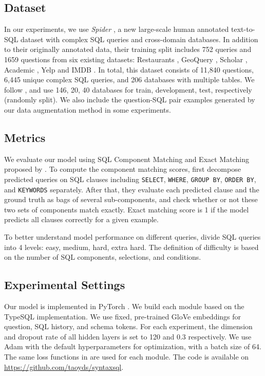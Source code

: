 \documentclass[11pt,a4paper]{article}
\begin{document}
\subsection{Dataset}
In our experiments, we use \textit{Spider} \cite{Yu&al.18.emnlp.corpus}, a new large-scale human annotated text-to-SQL dataset with complex SQL queries and cross-domain databases. In addition to their originally annotated data, their training split includes 752 queries and 1659 questions from six existing datasets: Restaurants \cite{tang2001using,Popescu03}, GeoQuery \cite{zelle96}, Scholar \cite{iyer17}, Academic \cite{li2014constructing}, Yelp and IMDB \cite{Yaghmazadeh17}.
In total, this dataset consists of 11,840 questions, 6,445 unique complex SQL queries, and 206 databases with multiple tables.
We follow \cite{Yu&al.18.emnlp.corpus}, and use 146, 20, 40 databases for train, development, test, respectively (randomly split).
We also include the question-SQL pair examples generated by our data augmentation method in some experiments.


\subsection{Metrics}
We evaluate our model using SQL Component Matching and Exact Matching proposed by \cite{Yu&al.18.emnlp.corpus}.
To compute the component matching scores, \citet{Yu&al.18.emnlp.corpus} first decompose predicted queries on SQL clauses including \texttt{SELECT}, \texttt{WHERE}, \texttt{GROUP BY}, \texttt{ORDER BY}, and \texttt{KEYWORDS} separately.
After that, they evaluate each predicted clause and the ground truth as bags of several sub-components, and check whether or not these two sets of components match exactly.
Exact matching score is 1 if the model predicts all clauses correctly for a given example.

To better understand model performance on different queries, 
\cite{Yu&al.18.emnlp.corpus} divide SQL queries into 4 levels: easy, medium, hard, extra hard. The definition of difficulty is based on the number of SQL components, selections, and conditions. 



\subsection{Experimental Settings}

Our model is implemented in PyTorch \cite{paszke2017automatic}. We build each module based on the TypeSQL \cite{Yu18} implementation. We use fixed, pre-trained GloVe \cite{pennington14} embeddings for question, SQL history, and schema tokens. For each experiment, the dimension and dropout rate of all hidden layers is set to 120 and 0.3 respectively. We use Adam \cite{Kingma15} with the default hyperparameters for optimization, with a batch size of 64. The same loss functions in \cite{Xu2017} are used for each module. The code is available on \url{https://github.com/taoyds/syntaxsql}. 
\end{document}
